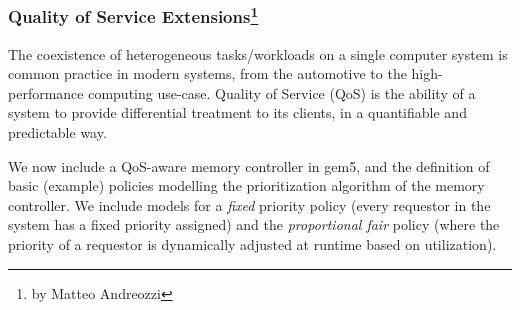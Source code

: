 \subsubsection[Quality of Service Extensions]{Quality of Service Extensions\footnote{by Matteo Andreozzi}}

The coexistence of heterogeneous tasks/workloads on a single computer system is common practice in modern systems, from the automotive to the high-performance computing use-case.
Quality of Service (QoS) is the ability of a system to provide differential treatment to its clients, in a quantifiable and predictable way.



We now include a QoS-aware memory controller in gem5, and the definition of basic (example) policies modelling the prioritization algorithm of the memory controller.
We include models for a \emph{fixed} priority policy (every requestor in the system has a fixed priority assigned) and the \emph{proportional fair} policy (where the priority of a requestor is dynamically adjusted at runtime based on utilization).

